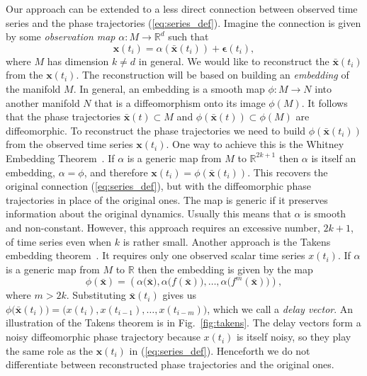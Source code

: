 \documentclass[referee, pdflatex, sn-mathphys-num]{sn-jnl}
\theoremstyle{definition}
\theoremstyle{plain}
\newcommand{\bx}{\ensuremath{\mathbf{x}}}
\newcommand{\bbx}{\ensuremath{\bar{\mathbf{x}}}}
\newcommand{\beps}{\ensuremath{\boldsymbol{\epsilon}}}
\begin{document}
	Our approach can be extended to a less direct connection between observed time series and the phase trajectories (\ref{eq:series_def}). Imagine the connection is given by some \emph{observation map} $\alpha: M \to \mathbb{R}^d$ such that
	\begin{equation}\label{eq:takens_series}
		\bx(t_i) = \alpha(\bbx(t_i)) + \beps(t_i),
	\end{equation}
	where $M$ has dimension $k \not= d$ in general. We would like to reconstruct the $\bbx(t_i)$ from the $\bx(t_i)$. The reconstruction will be based on building an \emph{embedding} of the manifold $M$. In general, an embedding is a smooth map $\phi: M \to N$ into another manifold $N$ that is a diffeomorphism onto its image $\phi(M)$. It follows that the phase trajectories $\bbx(t) \subset M$ and $\phi(\bbx(t)) \subset\phi(M)$ are diffeomorphic. To reconstruct the phase trajectories we need to build $\phi(\bbx(t_i))$ from the observed time series $\bx(t_i)$. One way to achieve this is the Whitney Embedding Theorem~\cite{whitney}. If $\alpha$ is a generic map from $M$ to $\mathbb{R}^{2k + 1}$ then $\alpha$ is itself an embedding, $\alpha = \phi$, and therefore $\bx(t_i) = \phi(\bbx(t_i))$. This recovers the original connection (\ref{eq:series_def}), but with the diffeomorphic phase trajectories in place of the original ones. The map is generic if it preserves information about the original dynamics. Usually this means that $\alpha$ is smooth and non-constant. However, this approach requires an excessive number, $2k + 1$, of time series even when $k$ is rather small. Another approach is the Takens embedding theorem~\cite{takens2006detecting}. It requires only one observed scalar time series $x(t_i)$. If $\alpha$ is a generic map from $M$ to $\mathbb{R}$ then the embedding is given by the map
	\begin{equation*}
		\phi(\bbx) = ( \alpha \big(\bbx \big), \alpha \big( f(\bbx) \big), \ldots, \alpha \big( f^m(\bbx) \big) ),
	\end{equation*}
	where $m > 2k$. Substituting $\bbx(t_i)$ gives us $\phi \big( \bbx(t_i) \big) = \big( x(t_i), x(t_{i-1}), \ldots, x(t_{i-m})\big)$, which we call a \emph{delay vector}. An illustration of the Takens theorem is in Fig.~\ref{fig:takens}. The delay vectors form a noisy diffeomorphic phase trajectory because $x(t_i)$ is itself noisy, so they play the same role as the $\bx(t_i)$ in (\ref{eq:series_def}). Henceforth we do not differentiate between reconstructed phase trajectories and the original ones.
	
\end{document}
